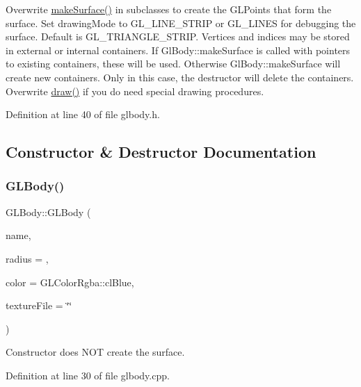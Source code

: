 Overwrite \mbox{\hyperlink{class_g_l_body_a73e51b159f343d0bda87f50df382b7db}{make\+Surface()}} in subclasses to create the G\+L\+Points that form the surface. Set drawing\+Mode to G\+L\+\_\+\+L\+I\+N\+E\+\_\+\+S\+T\+R\+IP or G\+L\+\_\+\+L\+I\+N\+ES for debugging the surface. Default is G\+L\+\_\+\+T\+R\+I\+A\+N\+G\+L\+E\+\_\+\+S\+T\+R\+IP. Vertices and indices may be stored in external or internal containers. If Gl\+Body\+::make\+Surface is called with pointers to existing containers, these will be used. Otherwise Gl\+Body\+::make\+Surface will create new containers. Only in this case, the destructor will delete the containers. Overwrite \mbox{\hyperlink{class_g_l_body_aaeb47c0a8cfc36caed81fc139c42ddfc}{draw()}} if you do need special drawing procedures. 

Definition at line 40 of file glbody.\+h.



\subsection{Constructor \& Destructor Documentation}
\mbox{\label{class_g_l_body_a86dd61f116bfd01d8f4d8656cfe1ddc9}} 
\subsubsection{\texorpdfstring{GLBody()}{GLBody()}\hspace{0.1cm}{\footnotesize\ttfamily [1/2]}}
{\footnotesize\ttfamily G\+L\+Body\+::\+G\+L\+Body (\begin{DoxyParamCaption}\item[{const Q\+String \&}]{name,  }\item[{float}]{radius = {},  }\item[{const \mbox{\hyperlink{class_g_l_color_rgba}{G\+L\+Color\+Rgba}} \&}]{color = {\ttfamily GLColorRgba\+:\+:clBlue},  }\item[{const Q\+String}]{texture\+File = {\ttfamily \char`\"{}\char`\"{}} }\end{DoxyParamCaption})}

Constructor does N\+OT create the surface. 

Definition at line 30 of file glbody.\+cpp.

\mbox{\label{class_g_l_body_a6e50d6cb10fbdb81e8aeb64ab3e46a66}} 

